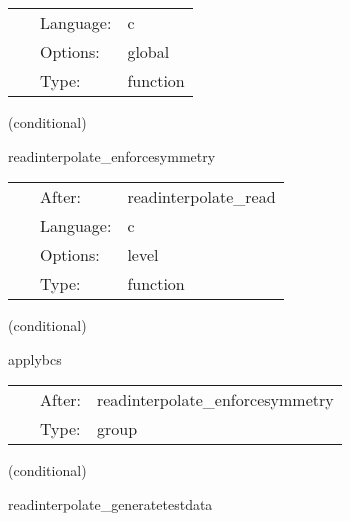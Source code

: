  \begin{tabular*}{160mm}{cll} 
~ & Language:  & c \\ 
~ & Options:  & global \\ 
~ & Type:  & function \\ 
\end{tabular*} 


\vspace{5mm}

   (conditional) 

\hspace{5mm} readinterpolate\_enforcesymmetry 

\hspace{5mm}{\it enforce symmeries if desired } 


\hspace{5mm}

 \begin{tabular*}{160mm}{cll} 
~ & After:  & readinterpolate\_read \\ 
~ & Language:  & c \\ 
~ & Options:  & level \\ 
~ & Type:  & function \\ 
\end{tabular*} 


\vspace{5mm}

   (conditional) 

\hspace{5mm} applybcs 

\hspace{5mm}{\it apply symmetry conditions to read in variables } 


\hspace{5mm}

 \begin{tabular*}{160mm}{cll} 
~ & After:  & readinterpolate\_enforcesymmetry \\ 
~ & Type:  & group \\ 
\end{tabular*} 


\vspace{5mm}

   (conditional) 

\hspace{5mm} readinterpolate\_generatetestdata 

\hspace{5mm}{\it generate polynomial test data } 


